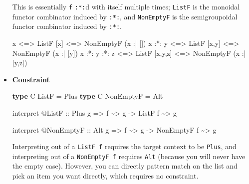\documentclass[]{article}
\newenvironment{Shaded}{}{}
\newcommand{\DataTypeTok}[1]{\textcolor[rgb]{0.56,0.13,0.00}{#1}}
\newcommand{\KeywordTok}[1]{\textcolor[rgb]{0.00,0.44,0.13}{\textbf{#1}}}
\newcommand{\NormalTok}[1]{#1}
\newcommand{\OperatorTok}[1]{\textcolor[rgb]{0.40,0.40,0.40}{#1}}
\newcommand{\OtherTok}[1]{\textcolor[rgb]{0.00,0.44,0.13}{#1}}
\begin{document}
\begin{itemize}
  This is essentially \texttt{f} \texttt{:*:}d with itself multiple times;
  \texttt{ListF} is the monoidal functor combinator induced by \texttt{:*:}, and
  \texttt{NonEmptyF} is the semigroupoidal functor combinator induced by
  \texttt{:*:}.

\begin{Shaded}
\begin{Highlighting}[]
\NormalTok{x             }\OperatorTok{<=>} \DataTypeTok{ListF}\NormalTok{ [x]     }\OperatorTok{<=>} \DataTypeTok{NonEmptyF}\NormalTok{ (x }\OperatorTok{:|}\NormalTok{ [])}
\NormalTok{x }\OperatorTok{:*:}\NormalTok{ y       }\OperatorTok{<=>} \DataTypeTok{ListF}\NormalTok{ [x,y]   }\OperatorTok{<=>} \DataTypeTok{NonEmptyF}\NormalTok{ (x }\OperatorTok{:|}\NormalTok{ [y])}
\NormalTok{x }\OperatorTok{:*:}\NormalTok{ y }\OperatorTok{:*:}\NormalTok{ z }\OperatorTok{<=>} \DataTypeTok{ListF}\NormalTok{ [x,y,z] }\OperatorTok{<=>} \DataTypeTok{NonEmptyF}\NormalTok{ (x }\OperatorTok{:|}\NormalTok{ [y,z])}
\end{Highlighting}
\end{Shaded}
\item
  \textbf{Constraint}

\begin{Shaded}
\begin{Highlighting}[]
\KeywordTok{type} \DataTypeTok{C} \DataTypeTok{ListF}     \OtherTok{=} \DataTypeTok{Plus}
\KeywordTok{type} \DataTypeTok{C} \DataTypeTok{NonEmptyF} \OtherTok{=} \DataTypeTok{Alt}

\NormalTok{interpret }\OperatorTok{@}\DataTypeTok{ListF}
\OtherTok{    ::} \DataTypeTok{Plus}\NormalTok{ g}
    \OtherTok{=>}\NormalTok{ f }\OperatorTok{\textasciitilde{}>}\NormalTok{ g}
    \OtherTok{{-}>} \DataTypeTok{ListF}\NormalTok{ f }\OperatorTok{\textasciitilde{}>}\NormalTok{ g}

\NormalTok{interpret }\OperatorTok{@}\DataTypeTok{NonEmptyF}
\OtherTok{    ::} \DataTypeTok{Alt}\NormalTok{ g}
    \OtherTok{=>}\NormalTok{ f }\OperatorTok{\textasciitilde{}>}\NormalTok{ g}
    \OtherTok{{-}>} \DataTypeTok{NonEmptyF}\NormalTok{ f }\OperatorTok{\textasciitilde{}>}\NormalTok{ g}
\end{Highlighting}
\end{Shaded}

  Interpreting out of a \texttt{ListF\ f} requires the target context to be
  \texttt{Plus}, and interpreting out of a \texttt{NonEmptyF\ f} requires
  \texttt{Alt} (because you will never have the empty case). However, you can
  directly pattern match on the list and pick an item you want directly, which
  requires no constraint.
\end{itemize}
\end{document}
